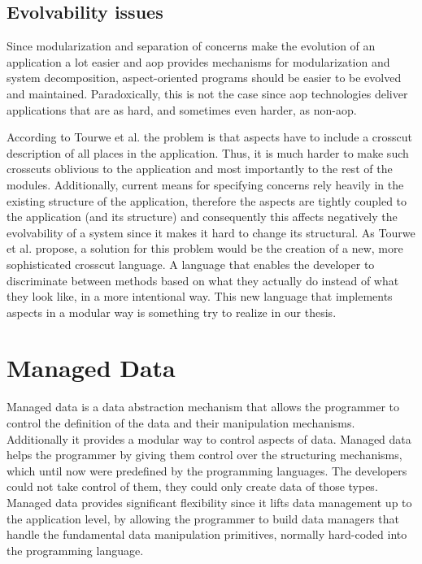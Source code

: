 \subsection{Evolvability issues}\label{Aspect Oriented Programming Evolvability}
Since modularization and separation of concerns make the evolution of an application a lot easier and \ac{aop} provides mechanisms for modularization and system decomposition, aspect-oriented programs should be easier to be evolved and maintained.
Paradoxically, this is not the case since \ac{aop} technologies deliver applications that are as hard, and sometimes even harder, as non-\ac{aop}.

According to Tourwe et al. \cite{tourwe2003existence} the problem is that aspects have to include a crosscut description of all places in the application.
Thus, it is much harder to make such crosscuts oblivious to the application and most importantly to the rest of the modules. 
Additionally, current means for specifying concerns rely heavily in the existing structure of the application, therefore the aspects are tightly coupled to the application (and its structure) and consequently this affects negatively the evolvability of a system since it makes it hard to change its structural.
As Tourwe et al. propose, a solution for this problem would be the creation of a new, more sophisticated crosscut language. 
A language that enables the developer to discriminate between methods based on what they actually do instead of what they look like, in a more intentional way.
This new language that implements aspects in a modular way is something try to realize in our thesis.

\section{Managed Data}\label{Managed Data}
Managed data \cite{loh2012managed} is a data abstraction mechanism that allows the programmer to control the definition of the data and their manipulation mechanisms. 
Additionally it provides a modular way to control aspects of data.
Managed data helps the programmer by giving them control over the structuring mechanisms, which until now were predefined by the programming languages. 
The developers could not take control of them, they could only create data of those types.
Managed data provides significant flexibility since it lifts data management up to the application level, by allowing the programmer to build data managers that handle the fundamental data manipulation primitives, normally hard-coded into the programming language. 

